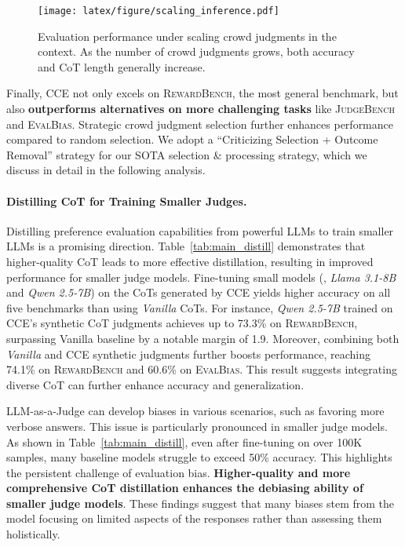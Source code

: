 \begin{figure*}[h]
\centering
  \texttt{[image: latex/figure/scaling\_inference.pdf]}
  \caption {Evaluation performance under scaling crowd judgments in the context. As the number of crowd judgments grows, both accuracy and CoT length generally increase.}
  \label{fig:scaling}
\end{figure*}



Finally, \textsc{CCE} not only excels on \textsc{RewardBench}, the most general benchmark, but also \textbf{outperforms alternatives on more challenging tasks} like \textsc{JudgeBench} and \textsc{EvalBias}. Strategic crowd judgment selection further enhances performance compared to random selection. We adopt a ``Criticizing Selection + Outcome Removal'' strategy for our SOTA selection \& processing strategy, which we discuss in detail in the following analysis.





\paragraph{Distilling CoT for Training Smaller Judges.} Distilling preference evaluation capabilities from powerful LLMs to train smaller LLMs is a promising direction. Table~\ref{tab:main_distill} demonstrates that higher-quality CoT leads to more effective distillation, resulting in improved performance for smaller judge models. Fine-tuning small models (\eg, \textit{Llama 3.1-8B} and \textit{Qwen 2.5-7B}) on the CoTs generated by \textsc{CCE} yields higher accuracy on all five benchmarks than using \textit{Vanilla} CoTs. For instance, \textit{Qwen 2.5-7B} trained on \textsc{CCE}'s synthetic CoT judgments achieves up to 73.3\% on \textsc{RewardBench}, surpassing Vanilla baseline by a notable margin of 1.9. Moreover, combining both \textit{Vanilla} and \textsc{CCE} synthetic judgments further boosts performance, reaching 74.1\% on \textsc{RewardBench} and 60.6\% on \textsc{EvalBias}. This result suggests integrating diverse CoT can further enhance accuracy and generalization.

LLM-as-a-Judge can develop biases in various scenarios, such as favoring more verbose answers. This issue is particularly pronounced in smaller judge models. As shown in Table~\ref{tab:main_distill}, even after fine-tuning on over 100K samples, many baseline models struggle to exceed 50\% accuracy. This highlights the persistent challenge of evaluation bias. \textbf{Higher-quality and more comprehensive CoT distillation enhances the debiasing ability of smaller judge models}. These findings suggest that many biases stem from the model focusing on limited aspects of the responses rather than assessing them holistically.




